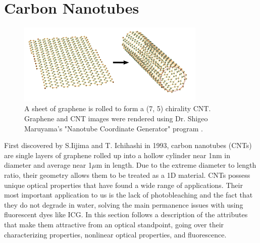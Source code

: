 \chapter{Carbon Nanotubes}
\begin{figure}[htb!]
	\centering
	\includegraphics[width=0.8\textwidth]{./Figures/CNTs/graphine_cnt.png}
	\caption{A sheet of graphene is rolled to form a (7, 5) chirality CNT. Graphene and CNT  images were rendered using Dr. Shigeo  Maruyama's  "Nanotube Coordinate Generator" program \cite{maruyama2}.}
	\label{fig:grahine_cnt}
\end{figure}
First discovered by S.Iijima and T. Ichihashi in 1993, carbon nanotubes (CNTs) are single layers of graphene rolled up into a hollow cylinder near 1nm in diameter and average near 1$\mu$m in length. Due to the extreme diameter to length ratio, their geometry allows them to be treated as a 1D material. CNTs possess unique optical properties that have found a wide range of applications\cite{yamashita}. Their most important application to us is the lack of photobleaching and the fact that they do not degrade in water, solving the main permanence issues with using fluorescent dyes like ICG. In this section follows a description of the attributes that make them attractive from an optical standpoint, going over their characterizing properties, nonlinear optical properties, and fluorescence.
